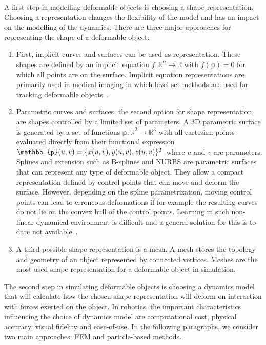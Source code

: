 \documentclass[\home/main.tex]{subfiles}
\begin{document}
A first step in modelling deformable objects is choosing a shape representation. Choosing a representation changes the flexibility of the model and has an impact on the modelling of the dynamics. There are three major approaches for representing the shape of a deformable object:
\begin{enumerate}
	\item First, implicit curves and surfaces can be used as representation. These shapes are defined by an implicit equation $f: \mathbb{R}^{n} \rightarrow \mathbb{R}$ with $f(\mathbb{p}) = 0$ for which all points are on the surface. Implicit equation representations are primarily used in medical imaging in which level set methods are used for tracking deformable objects~\autocite{Cremers2006}. 
	\item Parametric curves and surfaces, the second option for shape representation, are shapes controlled by a limited set of parameters. A 3D parametric surface is generated by a set of functions $\mathbb{p}: \mathbb{R}^{2} \rightarrow \mathbb{R}^{3}$ with all cartesian points evaluated directly from their functional expression $\mathbb{p}(u, v) =\\ \{x(u, v), y(u, v), z(u, v)\}^{T}$ where $u$ and $v$ are parameters. Splines and extension such as B-splines and NURBS are parametric surfaces that can represent any type of deformable object. They allow a compact representation defined by control points that can move and deform the surface. However, depending on the spline parametrization, moving control points can lead to erroneous deformations if for example the resulting curves do not lie on the convex hull of the control points. Learning in such non-linear dynamical environment is difficult and a general solution for this is to date not available~\autocite{rios2020}.
	\item A third possible shape representation is a mesh. A mesh stores the topology and geometry of an object represented by connected vertices. Meshes are the most used shape representation for a deformable object in simulation.
\end{enumerate}

The second step in simulating deformable objects is choosing a dynamics model that will calculate how the chosen shape representation will deform on interaction with forces exerted on the object. In robotics, the important characteristics influencing the choice of dynamics model are computational cost, physical accuracy, visual fidelity and ease-of-use. In the following paragraphs, we consider two main approaches: \gls{FEM} and particle-based methods.
\end{document}
